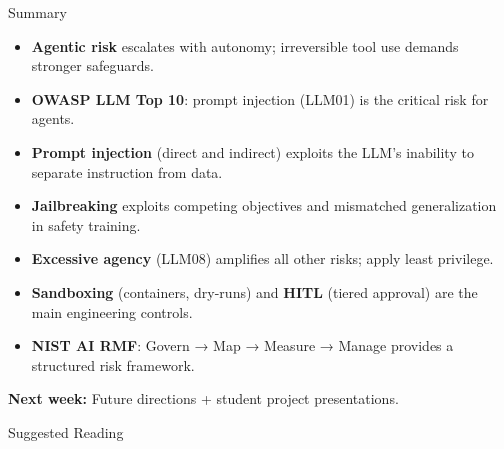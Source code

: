 \documentclass[aspectratio=169,10pt]{beamer}
\begin{document}
\begin{frame}{Summary}
  \begin{itemize}
    \item \textbf{Agentic risk} escalates with autonomy; irreversible tool use demands stronger safeguards.
    \item \textbf{OWASP LLM Top 10}: prompt injection (LLM01) is the critical risk for agents.
    \item \textbf{Prompt injection} (direct and indirect) exploits the LLM's inability to separate instruction from data.
    \item \textbf{Jailbreaking} exploits competing objectives and mismatched generalization in safety training.
    \item \textbf{Excessive agency} (LLM08) amplifies all other risks; apply least privilege.
    \item \textbf{Sandboxing} (containers, dry-runs) and \textbf{HITL} (tiered approval) are the main engineering controls.
    \item \textbf{NIST AI RMF}: Govern → Map → Measure → Manage provides a structured risk framework.
  \end{itemize}
  \vspace{0.3em}
  \textbf{Next week:} Future directions + student project presentations.
\end{frame}

\begin{frame}[allowframebreaks]{Suggested Reading}
  \nocite{owasp2023llm, nist2023airm, perez2022ignoreprevious,
          wei2023jailbroken, bai2022constitutional}
  
\end{frame}
\end{document}
